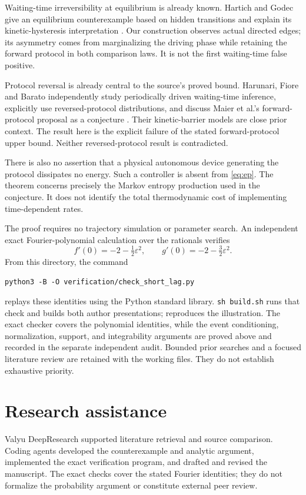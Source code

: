 \documentclass[11pt]{amsart}
\begin{document}
Waiting-time irreversibility at equilibrium is already known.
Hartich and Godec give an equilibrium counterexample based on hidden
transitions and explain its kinetic-hysteresis interpretation
\cite{hartich2021}. Our construction observes actual directed edges;
its asymmetry comes from marginalizing the driving phase while
retaining the forward protocol in both comparison laws.
It is not the first waiting-time false positive.

Protocol reversal is already central to the source's proved bound.
Harunari, Fiore and Barato independently study periodically driven
waiting-time inference, explicitly use reversed-protocol distributions,
and discuss Maier et al.'s forward-protocol proposal as a conjecture
\cite{harunari2024}. Their kinetic-barrier models are close prior context.
The result here is the explicit failure of the stated forward-protocol
upper bound. Neither reversed-protocol result is contradicted.

There is also no assertion that a physical autonomous device generating
the protocol dissipates no energy. Such a controller is absent from
\eqref{eq:ep}. The theorem concerns precisely the Markov entropy
production used in the conjecture. It does not identify the total
thermodynamic cost of implementing time-dependent rates.

The proof requires no trajectory simulation or parameter search.
An independent exact Fourier-polynomial calculation over the rationals
verifies
\[
 f'(0)=-2-\tfrac12\varepsilon^2,\qquad
 g'(0)=-2-\tfrac32\varepsilon^2.
\]
From this directory, the command
\begin{center}\small
 \verb|python3 -B -O verification/check_short_lag.py|
\end{center}
replays these identities using the Python standard library.
\texttt{sh build.sh} runs that check and builds both author presentations;
 reproduces the illustration.
The exact checker covers the polynomial identities, while the event
conditioning, normalization, support, and integrability arguments are
proved above and recorded in the separate independent audit.
Bounded prior searches and a focused literature review are retained with
the working files. They do not establish exhaustive priority.

\ifdefined\journalversion
\section*{Research assistance}
Valyu DeepResearch supported literature retrieval and source comparison.
Coding agents developed the counterexample and analytic
argument, implemented the exact verification program, and drafted and
revised the manuscript. The exact checks cover the stated Fourier
identities; they do not formalize the probability argument or constitute
external peer review.
\fi



\end{document}
